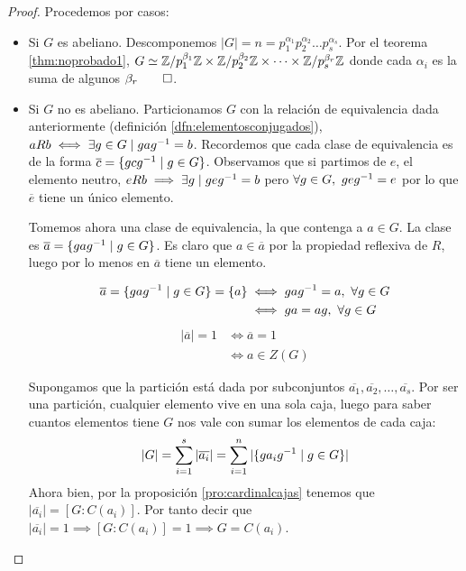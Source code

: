 \begin{proof}
	Procedemos por casos:
	\begin{itemize}
		\item Si $G$ es abeliano. Descomponemos $|G| = n = p_1^{\alpha_1}p_2^{\alpha_2}\dots p_s^{\alpha_s}$. Por el teorema \ref{thm:noprobado1}, $G \simeq \mathbb{Z}/p_1^{\beta_1}\mathbb{Z} \times \mathbb{Z}/p_2^{\beta_2}\mathbb{Z} \times \dots \times \mathbb{Z}/p_s^{\beta_r}\mathbb{Z}$ donde cada $\alpha_i$ es la suma de algunos $\beta_r \qed$.
		
		\item Si $G$ no es abeliano. Particionamos $G$ con la relación de equivalencia dada anteriormente (definición \ref{dfn:elementosconjugados}), $aRb \iff \exists g \in G \mid gag^{-1} = b$. Recordemos que cada clase de equivalencia es de la forma $\overline{c} = \{gcg^{-1} \mid g \in G\}$. Observamos que si partimos de $e$, el elemento neutro, $eRb \implies \exists g \mid geg^{-1} = b$ pero $\forall g \in G,\ geg^{-1} = e$ por lo que $\overline{e}$ tiene un único elemento.
		
		Tomemos ahora una clase de equivalencia, la que contenga a $a \in G$. La clase es $\overline{a} = \{gag^{-1} \mid g \in G\}$. Es claro que $a \in \overline{a}$ por la propiedad reflexiva de $R$, luego por lo menos en $\overline{a}$ tiene un elemento.
		
		\begin{align*}
		\overline{a} = \{gag^{-1} \mid g \in G\} = \{a\} &\iff gag^{-1} = a,\ \forall g \in G \\
		&\iff ga = ag,\ \forall g \in G
		\end{align*}
		\begin{align*}
		|\overline{a}| = 1 &\iff \overline{a} = 1 \\
		&\iff a \in Z(G)
		\end{align*}
		
		Supongamos que la partición está dada por subconjuntos $\overline{a_1}, \overline{a_2}, \dots, \overline{a_s}$. Por ser una partición, cualquier elemento vive en una sola caja, luego para saber cuantos elementos tiene $G$ nos vale con sumar los elementos de cada caja:
		\begin{align*}
		|G| = \sum_{i = 1}^{s} |\overline{a_i}| = \sum_{i = 1}^n |\{ga_ig^{-1} \mid g \in G\}|
		\end{align*}
		Ahora bien, por la proposición \ref{pro:cardinalcajas} tenemos que $|\overline{a_i}| = [G:C(a_i)]$. Por tanto decir que $|\overline{a_i}| = 1 \implies [G:C(a_i)] = 1 \implies G = C(a_i)$.
		

\end{itemize}
\end{proof}
